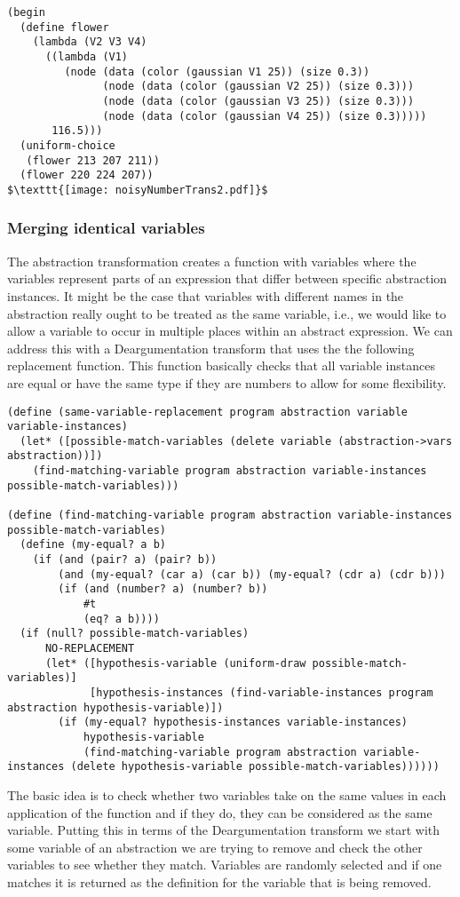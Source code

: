 \documentclass[a4paper,10pt]{article}
\begin{document}
\begin{lstlisting}[mathescape=true]
(begin
  (define flower
    (lambda (V2 V3 V4)
      ((lambda (V1)
         (node (data (color (gaussian V1 25)) (size 0.3))
               (node (data (color (gaussian V2 25)) (size 0.3)))
               (node (data (color (gaussian V3 25)) (size 0.3)))
               (node (data (color (gaussian V4 25)) (size 0.3)))))
       116.5)))
  (uniform-choice
   (flower 213 207 211))
  (flower 220 224 207))
$\texttt{[image: noisyNumberTrans2.pdf]}$
\end{lstlisting}
\subsubsection{Merging identical variables}
The abstraction transformation creates a function with variables where the variables represent parts of an expression that differ between specific abstraction instances.  It might be the case that variables with different names in the abstraction really ought to be treated as the same variable, i.e., we would like to allow a variable to occur in multiple places within an abstract expression.  We can address this with a Deargumentation transform that uses the the following replacement function.  This function basically checks that all variable instances are equal or have the same type if they are numbers to allow for some flexibility.
\begin{lstlisting}[frame=trbl]
(define (same-variable-replacement program abstraction variable variable-instances)
  (let* ([possible-match-variables (delete variable (abstraction->vars abstraction))])
    (find-matching-variable program abstraction variable-instances possible-match-variables)))

(define (find-matching-variable program abstraction variable-instances possible-match-variables)
  (define (my-equal? a b) 
    (if (and (pair? a) (pair? b)) 
        (and (my-equal? (car a) (car b)) (my-equal? (cdr a) (cdr b))) 
        (if (and (number? a) (number? b))
            #t
            (eq? a b)))) 
  (if (null? possible-match-variables)
      NO-REPLACEMENT
      (let* ([hypothesis-variable (uniform-draw possible-match-variables)]
             [hypothesis-instances (find-variable-instances program abstraction hypothesis-variable)])
        (if (my-equal? hypothesis-instances variable-instances)
            hypothesis-variable
            (find-matching-variable program abstraction variable-instances (delete hypothesis-variable possible-match-variables))))))
\end{lstlisting}
The basic idea is to check whether two variables take on the same values in each application of the function and if they do, they can be considered as the same variable.  Putting this in terms of the Deargumentation transform we start with some variable of an abstraction we are trying to remove and check the other variables to see whether they match.  Variables are randomly selected and if one matches it is returned as the definition for the variable that is being removed.  
\end{document}
